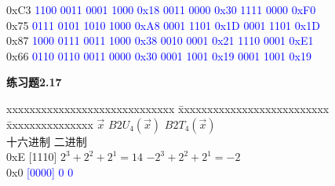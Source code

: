 \documentclass{article}
\begin{document}
\begin{CJK}{UTF8}{uyhei}
\begin{tabbing}
	0xC3	\hspace{2em}\textcolor{blue}{1100 0011}		\>	\textcolor{blue}{0001 1000}	\hspace{2em}\textcolor{blue}{0x18}	\>	\textcolor{blue}{0011 0000}	\hspace{2em} \textcolor{blue}{0x30}	\>	\textcolor{blue}{1111 0000}	\hspace{2em}\textcolor{blue}{0xF0}	\\
	0x75	\hspace{2em} \textcolor{blue}{0111 0101}		\>	\textcolor{blue}{1010 1000} \hspace{2em}\textcolor{blue}{0xA8}	\>	\textcolor{blue}{0001 1101}	\hspace{2em} \textcolor{blue}{0x1D}	\>	\textcolor{blue}{0001 1101}	\hspace{2em}\textcolor{blue}{0x1D}	\\
	0x87	\hspace{2em} \textcolor{blue}{1000 0111}		\>	\textcolor{blue}{0011 1000} \hspace{2em}\textcolor{blue}{0x38}	\>	\textcolor{blue}{0010 0001}	\hspace{2em} \textcolor{blue}{0x21}	\>	\textcolor{blue}{1110 0001}	\hspace{2em}\textcolor{blue}{0xE1}	\\
	0x66	\hspace{2em} \textcolor{blue}{0110 0110}		\>	\textcolor{blue}{0011 0000} \hspace{2em}\textcolor{blue}{0x30}	\>	\textcolor{blue}{0001 1001}	\hspace{2em} \textcolor{blue}{0x19}	\>	\textcolor{blue}{0001 1001}	\hspace{2em}\textcolor{blue}{0x19}	\\
\end{tabbing}
\textbf{练习题2.17}
\begin{tabbing}
	xxxxxxxxxxxxxxxxxxxxxxxxxxxxx	\=	xxxxxxxxxxxxxxxxxxxxxxxxxx	\=	xxxxxxxxxxxxxxx	\kill
	\hspace{5em}$\vec{x}$	\>	\hspace{2em}$B2U_4(\vec{x})$	\>		\hspace{3em}$B2T_4(\vec{x})$	\\
	十六进制 \hspace{2em}	二进制	\>		\>	\\[2ex]
	\hspace{1em}0xE	\hspace{3.5em}[1110]	\>	$2^3+2^2+2^1=14$	  \>		$-2^3+2^2+2^1=-2$	\\
	\hspace{1em}0x0 \hspace{3.7em}\textcolor{blue}{[0000]}	\>	\hspace{3em}\textcolor{blue}0		\>	\hspace{4em}\textcolor{blue}0	\\

\end{tabbing}
\end{CJK}
\end{document}

